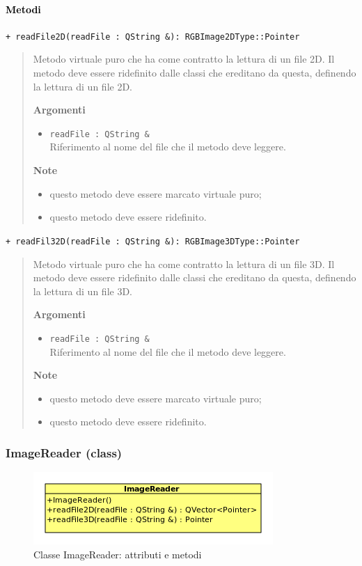 \paragraph{\textcolor{black}{Metodi\\}}
\color{blue}\verb!+ readFile2D(readFile : QString &): RGBImage2DType::Pointer!
\begin{quote}
\color{black} Metodo virtuale puro che ha come contratto la lettura di un file 2D. Il metodo deve essere ridefinito dalle classi che ereditano da questa, definendo la lettura di un file 2D.

\textbf{Argomenti}
\begin{itemize}
\item \verb!readFile : QString &! \\ Riferimento al nome del file che il metodo deve leggere.
\end{itemize}

\textbf{Note}
\begin{itemize}
\item questo metodo deve essere marcato virtuale puro;
\item questo metodo deve essere ridefinito.
\end{itemize}
\end{quote} 
\color{blue}\verb!+ readFil32D(readFile : QString &): RGBImage3DType::Pointer!
\begin{quote}
\color{black} Metodo virtuale puro che ha come contratto la lettura di un file 3D. Il metodo deve essere ridefinito dalle classi che ereditano da questa, definendo la lettura di un file 3D.

\textbf{Argomenti}
\begin{itemize}
\item \verb!readFile : QString &! \\ Riferimento al nome del file che il metodo deve leggere.
\end{itemize}

\textbf{Note}
\begin{itemize}
\item questo metodo deve essere marcato virtuale puro;
\item questo metodo deve essere ridefinito.
\end{itemize}
\end{quote} 

\color{black}
\pagebreak
\subsubsection{ImageReader (class)}
\label{speimagereader}
\begin{figure}[!h]
\centering
			\includegraphics[scale=5]{./Content/Immagini/model/ImageReader.png}
			\caption{Classe ImageReader: attributi e metodi}
			\label{cl_imagereader}
\end{figure}
